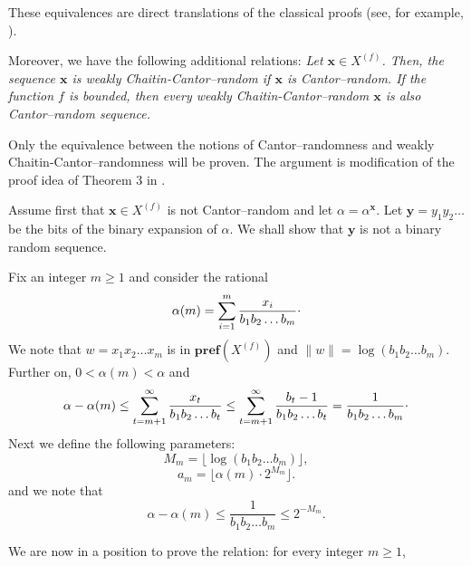 \documentclass[12pt]{iopart}
\begin{document}
These equivalences are direct translations of the classical proofs
 (see, for example, \cite{calude:02}).

Moreover, we have the following additional relations:
{\it
Let ${\mathbf x} \in{X^{(f)}}$. Then, the sequence ${\mathbf x}$ is weakly
Chaitin-Cantor--random if ${\mathbf x}$ is Cantor--random.  If the function $f$
is bounded, then every  weakly
Chaitin-Cantor--random ${\mathbf x}$ is also Cantor--random sequence.}

Only the equivalence between the notions of Cantor--randomness
and
weakly Chaitin-Cantor--randomness will be proven.%
The argument  is modification of the proof idea of Theorem 3 in
\cite{ludwig-02}.

 Assume first that ${\mathbf x} \in{X^{(f)}}$ is not Cantor--random and let
$\alpha = \alpha^{{\mathbf x}}$. Let  ${\mathbf y} = y_{1}y_{2}\ldots$ be the bits of the
binary expansion of $\alpha$. We shall show that ${\mathbf y}$ is not a binary random
sequence.

Fix an integer $m\ge 1$ and consider the rational
\[\alpha (m) = \sum_{i=1}^{m} \frac{x_{i}}{b_{1}b_{2}\ldots
b_{m}}{\raisebox{.5ex}{.}}\]
We note that $w=x_{1}x_{2}\ldots x_{m}$ is in ${{\mathbf{pref}({{X^{(f)}}})}}$
and $\parallel w \parallel = \log (b_{1}b_{2}\ldots b_{m})$. Further on,  $0
< \alpha(m) < \alpha$ and
\[\alpha - \alpha(m)   \le  \sum_{t=m+1}^{\infty}
\frac{x_{t}}{b_{1}b_{2}\ldots b_{t}}
  \le  \sum_{t=m+1}^{\infty} \frac{b_{t}-1}{b_{1}b_{2}\ldots b_{t}}
=  \frac{1}{b_{1}b_{2}\ldots b_{m}}{\raisebox{.5ex}{.}}
\]
 Next we define the following parameters:
 \begin{equation}
\label{M}
M_{m} = \lfloor \log (b_{1}b_{2}\ldots b_{m})\rfloor,
\end{equation}
\begin{equation}
\label{a}
a_{m} = \lfloor \alpha(m)\cdot 2^{M_{m}}  \rfloor.
\end{equation}
and we note that
\begin{equation}
\label{cantorerror}
 \alpha - \alpha(m) \le \frac{1}{b_{1}b_{2}\ldots b_{m}} \le 2^{-M_{m}}.
 \end{equation}

We are now in a position to  prove the relation: for every integer $m\ge 1$,
\end{document}
